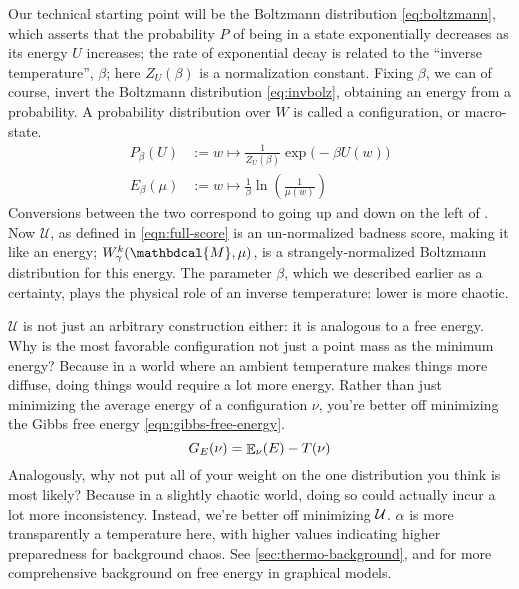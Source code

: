 \documentclass{article}
\theoremstyle{plain}
\theoremstyle{definition}
\theoremstyle{remark}
\let\H\relax
\DeclareMathOperator{\H}{\mathrm{H}} %
\DeclareMathOperator*{\E}{\mathbb{E}} %
\newcommand{\dg}[1]{\mathbdcal{#1}}
\numberwithin{equation}{section}
\begin{document}
Our technical starting point will be the Boltzmann distribution \eqref{eq:boltzmann}, which asserts that the probability $P$ of being in a state exponentially decreases as its energy $U$ increases; the rate of exponential decay is related to the ``inverse temperature'', $\beta$; here $Z_U(\beta)$ is a normalization constant. Fixing $\beta$, we can of course, invert the Boltzmann distribution \eqref{eq:invbolz}, obtaining an energy from a probability. A probability distribution over $W$ is called a configuration, or macro-state.
\begin{align}
 P_{\beta}(U) &:= w \mapsto  \frac{1}{Z_U(\beta)}\exp\Big(-\beta U(w)\Big) \label{eq:boltzmann} \\
	E_{\beta}(\mu) &:= w \mapsto \frac{1}{\beta} \ln \left(\frac{1}{\mu(w)}\right) \label{eq:invbolz}
\end{align}
Conversions between the two correspond to going up and down on the left of . 
Now $\mathcal U$, as defined in \eqref{eqn:full-score} is an un-normalized badness score, making it like an energy; $W^k_\gamma(\dg M, \mu)$, is a strangely-normalized Boltzmann distribution for this energy. The parameter $\beta$, which we described earlier as a certainty, plays the physical role of an inverse temperature: lower is more chaotic. 

$\mathcal U$ is not just an arbitrary construction either: it is analogous to a free energy. Why is the most favorable configuration not just a point mass as the minimum energy? Because in a world where an ambient temperature makes things more diffuse, doing things would require a lot more energy. Rather than just minimizing the average energy of a configuration $\nu$, you're better off minimizing the Gibbs free energy \eqref{eqn:gibbs-free-energy}. 
\begin{equation}
	G_E(\nu) = {\E}_\nu( E )  - T \H(\nu) \label{eqn:gibbs-free-energy}
\end{equation}
Analogously, why not put all of your weight on the one distribution you think is most likely? Because in a slightly chaotic world, doing so could actually incur a lot more inconsistency. Instead, we're better off minimizing $\cal U$. $\alpha$ is more transparently a temperature here, with higher values indicating higher preparedness for background chaos. 
%
See \ref{sec:thermo-background}, and
	\cite{bethe,friston2009free} for more comprehensive background
	on free energy 
in graphical models.
\end{document}
